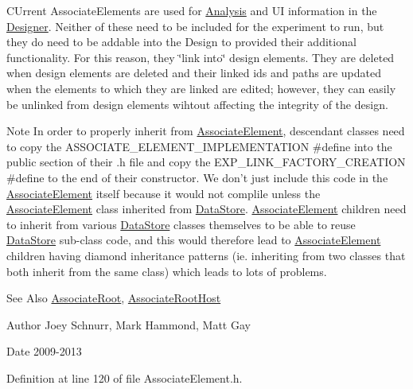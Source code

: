 C\-Urrent Associate\-Elements are used for \hyperlink{class_picto_1_1_analysis}{Analysis} and U\-I information in the \hyperlink{class_designer}{Designer}. Neither of these need to be included for the experiment to run, but they do need to be addable into the Design to provided their additional functionality. For this reason, they \char`\"{}link into\char`\"{} design elements. They are deleted when design elements are deleted and their linked ids and paths are updated when the elements to which they are linked are edited; however, they can easily be unlinked from design elements wihtout affecting the integrity of the design. \begin{DoxyNote}{Note}
In order to properly inherit from \hyperlink{class_picto_1_1_associate_element}{Associate\-Element}, descendant classes need to copy the A\-S\-S\-O\-C\-I\-A\-T\-E\-\_\-\-E\-L\-E\-M\-E\-N\-T\-\_\-\-I\-M\-P\-L\-E\-M\-E\-N\-T\-A\-T\-I\-O\-N \#define into the public section of their .h file and copy the E\-X\-P\-\_\-\-L\-I\-N\-K\-\_\-\-F\-A\-C\-T\-O\-R\-Y\-\_\-\-C\-R\-E\-A\-T\-I\-O\-N \#define to the end of their constructor. We don't just include this code in the \hyperlink{class_picto_1_1_associate_element}{Associate\-Element} itself because it would not complile unless the \hyperlink{class_picto_1_1_associate_element}{Associate\-Element} class inherited from \hyperlink{class_picto_1_1_data_store}{Data\-Store}. \hyperlink{class_picto_1_1_associate_element}{Associate\-Element} children need to inherit from various \hyperlink{class_picto_1_1_data_store}{Data\-Store} classes themselves to be able to reuse \hyperlink{class_picto_1_1_data_store}{Data\-Store} sub-\/class code, and this would therefore lead to \hyperlink{class_picto_1_1_associate_element}{Associate\-Element} children having diamond inheritance patterns (ie. inheriting from two classes that both inherit from the same class) which leads to lots of problems. 
\end{DoxyNote}
\begin{DoxySeeAlso}{See Also}
\hyperlink{class_picto_1_1_associate_root}{Associate\-Root}, \hyperlink{class_picto_1_1_associate_root_host}{Associate\-Root\-Host} 
\end{DoxySeeAlso}
\begin{DoxyAuthor}{Author}
Joey Schnurr, Mark Hammond, Matt Gay 
\end{DoxyAuthor}
\begin{DoxyDate}{Date}
2009-\/2013 
\end{DoxyDate}


Definition at line 120 of file Associate\-Element.\-h.



